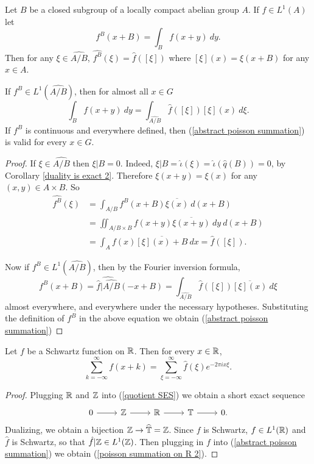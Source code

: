 \begin{theorem}
Let $B$ be a closed subgroup of a locally compact abelian group $A$.
If $f \in L^1(A)$ let
\[f^B(x + B) = \int_{B} f(x + y)~dy.\]
Then for any $\xi \in \widehat{A/B}$, $\widehat{f^B}(\xi) = \hat f([\xi])$
where $[\xi](x) = \xi(x + B)$ for any $x \in A$.

If $f^{B} \in L^1(\widehat{A/B})$, then for almost all $x \in G$
\begin{equation}
\label{abstract poisson summation}
\int_{B} f(x + y)~dy = \int_{\widehat{A/B}} \hat f([\xi]) [\xi](x) ~d\xi.
\end{equation}
If $f^B$ is continuous and everywhere defined, then (\ref{abstract poisson summation}) is valid for every $x \in G$.
\end{theorem}
\begin{proof}
If $\xi \in \widehat{A/B}$ then $\xi|B = 0$. Indeed, $\xi|B = \hat \iota(\xi) = \hat \iota(\hat q(B)) = 0$, by Corollary \ref{duality is exact 2}.
Therefore $\xi(x + y) = \xi(x)$ for any $(x, y) \in A \times B$.
So
\begin{align*}\widehat{f^B}(\xi) &= \int_{A/B} f^B(x + B) \overline{\xi(x)}~d(x + B)\\& = \iint_{A/B \times B} f(x + y) \overline{\xi(x + y)}~dy~d(x+B) \\&= \int_{A} f(x)\overline{[\xi](x) + B}~dx = \hat f([\xi]).\end{align*}

Now if $f^{B} \in L^1(\widehat{A/B})$, then by the Fourier inversion formula,
\[f^B(x + B) = \widehat{\hat f|\widehat{A/B}}(-x + B) = \int_{\widehat{A/B}} \hat f([\xi]) \overline{[\xi](x)}~d\xi\]
almost everywhere, and everywhere under the necessary hypotheses.
Substituting the definition of $f^B$ in the above equation we obtain (\ref{abstract poisson summation})
\end{proof}

\begin{corollary}
\label{poisson summation on R}
Let $f$ be a Schwartz function on $\mathbb{R}$. Then for every $x \in \mathbb{R}$,
\begin{equation}
\label{poisson summation on R 2}
\sum_{k=-\infty}^{\infty} f(x + k) = \sum_{\xi = -\infty}^{\infty} \hat f(\xi) e^{-2\pi ix\xi}.
\end{equation}
\end{corollary}
\begin{proof}
Plugging $\mathbb{R}$ and $\mathbb{Z}$ into (\ref{quotient SES}) we obtain a short exact sequence
$$\begin{tikzcd}
0 \arrow[r] & \ZZ \arrow[r] & \RR \arrow[r] & \Torus \arrow[r] & 0.
\end{tikzcd}$$
Dualizing, we obtain a bijection $\mathbb{Z} \to \widehat{\mathbb{T}} = \mathbb{Z}$.
Since $f$ is Schwartz, $f \in L^1(\mathbb{R})$ and $\hat f$ is Schwartz, so that $\hat f|\mathbb{Z} \in L^1(\mathbb{Z})$.
Then plugging in $f$ into (\ref{abstract poisson summation}) we obtain (\ref{poisson summation on R 2}).
\end{proof}

